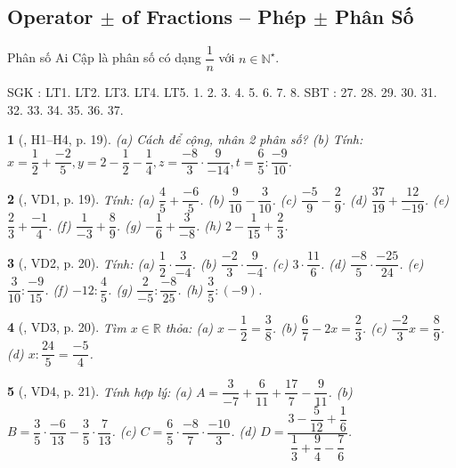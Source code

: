 \documentclass{article}
\newtheorem{baitoan}{}
\begin{document}
\subsection{Operator $\pm$ of Fractions -- Phép $\pm$ Phân Số}
 Phân số Ai Cập là phân số có dạng $\dfrac{1}{n}$ với $n\in\mathbb{N}^\star$.

\noindent SGK \cite[Chap. V, \S3, pp. 34--38]{SGK_Toan_6_Canh_Dieu_tap_2}: LT1. LT2. LT3. LT4. LT5. 1. 2. 3. 4. 5. 6. 7. 8. SBT \cite[Chap. V, \S3, pp. 37--38]{SBT_Toan_6_Canh_Dieu_tap_2}: 27. 28. 29. 30. 31. 32. 33. 34. 35. 36. 37.

\begin{baitoan}[\cite{Binh_boi_duong_Toan_6_tap_2}, H1--H4, p. 19]
	(a) Cách để cộng, nhân 2 phân số? (b) Tính: $x = \dfrac{1}{2} + \dfrac{-2}{5},y = 2 - \dfrac{1}{2} - \dfrac{1}{4},z = \dfrac{-8}{3}\cdot\dfrac{9}{-14},t = \dfrac{6}{5}:\dfrac{-9}{10}$.
\end{baitoan}

\begin{baitoan}[\cite{Binh_boi_duong_Toan_6_tap_2}, VD1, p. 19]
	Tính: (a) $\dfrac{4}{5} + \dfrac{-6}{5}$. (b) $\dfrac{9}{10} - \dfrac{3}{10}$. (c) $\dfrac{-5}{9} - \dfrac{2}{9}$. (d) $\dfrac{37}{19} + \dfrac{12}{-19}$. (e) $\dfrac{2}{3} + \dfrac{-1}{4}$. (f) $\dfrac{1}{-3} + \dfrac{8}{9}$. (g) $-\dfrac{1}{6} + \dfrac{3}{-8}$. (h) $2 - \dfrac{1}{15} + \dfrac{2}{3}$.
\end{baitoan}

\begin{baitoan}[\cite{Binh_boi_duong_Toan_6_tap_2}, VD2, p. 20]
	Tính: (a) $\dfrac{1}{2}\cdot\dfrac{3}{-4}$. (b) $\dfrac{-2}{3}\cdot\dfrac{9}{-4}$. (c) $3\cdot\dfrac{11}{6}$. (d) $\dfrac{-8}{5}\cdot\dfrac{-25}{24}$. (e) $\dfrac{3}{10}:\dfrac{-9}{15}$. (f) $-12:\dfrac{4}{5}$. (g) $\dfrac{2}{-5}:\dfrac{-8}{25}$. (h) $\dfrac{3}{5}:(-9)$.
\end{baitoan}

\begin{baitoan}[\cite{Binh_boi_duong_Toan_6_tap_2}, VD3, p. 20]
	Tìm $x\in\mathbb{R}$ thỏa: (a) $x - \dfrac{1}{2} = \dfrac{3}{8}$. (b) $\dfrac{6}{7} - 2x = \dfrac{2}{3}$. (c) $\dfrac{-2}{3}x = \dfrac{8}{9}$. (d) $x:\dfrac{24}{5} = \dfrac{-5}{4}$.
\end{baitoan}

\begin{baitoan}[\cite{Binh_boi_duong_Toan_6_tap_2}, VD4, p. 21]
	Tính hợp lý: (a) $A = \dfrac{3}{-7} + \dfrac{6}{11} + \dfrac{17}{7} - \dfrac{9}{11}$. (b) $B = \dfrac{3}{5}\cdot\dfrac{-6}{13} - \dfrac{3}{5}\cdot\dfrac{7}{13}$. (c) $C = \dfrac{6}{5}\cdot\dfrac{-8}{7}\cdot\dfrac{-10}{3}$. (d) $D = \dfrac{3 - \dfrac{5}{12} + \dfrac{1}{6}}{\dfrac{1}{3} + \dfrac{9}{4} - \dfrac{7}{6}}$.
\end{baitoan}
\end{document}
